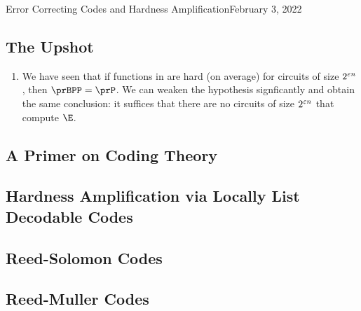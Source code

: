 \begin{lecture}{3}{Error Correcting Codes and Hardness Amplification}{February 3, 2022}
\label{lec:03}

\subsection*{The Upshot}

\begin{enumerate}
  \item We have seen that if functions in \E are hard (on average) for circuits
    of size $2^{\varepsilon n}$, then $\prBPP = \prP$. We can weaken the hypothesis
    signficantly and obtain the same conclusion: it suffices that there are
    no circuits of size $2^{\varepsilon n}$ that compute $\E$.
\end{enumerate}
  

\subsection{A Primer on Coding Theory}

\subsection{Hardness Amplification via Locally List Decodable Codes}

\subsection{Reed-Solomon Codes}

\subsection{Reed-Muller Codes}

\end{lecture}
